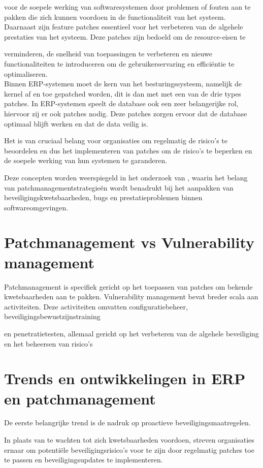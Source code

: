 voor de soepele werking van softwaresystemen door problemen of fouten aan te pakken die zich kunnen voordoen in de functionaliteit van het systeem. Daarnaast zijn feature patches essentieel voor het verbeteren van de algehele prestaties van het systeem. Deze patches zijn bedoeld om de resource-eisen te 

verminderen, de snelheid van toepassingen te verbeteren en nieuwe functionaliteiten te introduceren om de gebruikerservaring en efficiëntie te optimaliseren. \\

Binnen ERP-systemen moet de kern van het besturingssysteem, namelijk de kernel af en toe gepatched worden, dit is dan met met een van de drie types patches. In ERP-systemen speelt de database ook een zeer belangerijke rol, hiervoor zij er ook patches nodig. Deze patches zorgen ervoor dat de database optimaal blijft werken en dat de data veilig is.

Het is van cruciaal belang voor organisaties om regelmatig de risico's te beoordelen en dus het implementeren van patches om de risico's te beperken en de soepele werking van hun systemen te garanderen.

Deze concepten worden weerspiegeld in het onderzoek van \textcite{Wrobel2023}, waarin het belang van patchmanagementstrategieën wordt benadrukt bij het aanpakken van beveiligingskwetsbaarheden, bugs en prestatieproblemen binnen softwareomgevingen.

\section{Patchmanagement vs Vulnerability management}
Patchmanagement is specifiek gericht op het toepassen van patches om bekende kwetsbaarheden aan te pakken. Vulnerability management bevat breder scala aan activiteiten. Deze activiteiten omvatten configuratiebeheer, beveiligingsbewustzijnstraining 

en penetratietesten, allemaal gericht op het verbeteren van de algehele beveiliging en het beheersen van risico’s \autocite{Danby2023}


\section{Trends en ontwikkelingen in  ERP en patchmanagement}

De eerste belangrijke trend is de nadruk op proactieve beveiligingsmaatregelen.

In plaats van te wachten tot zich kwetsbaarheden voordoen, streven organisaties ernaar om potentiële beveiligingsrisico's voor te zijn door regelmatig patches toe te passen en beveiligingsupdates te implementeren.

